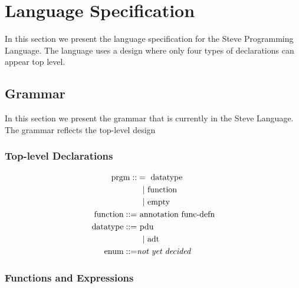 \newcommand{\pn}[1]{ \textnormal{#1} }
\newcommand{\oo}{\; \mid \;}
\newcommand{\nb}{~~~|~}
\newcommand{\sk}{\dots }
\newcommand{\ww}{\;}
\newcommand{\nn}{\perp}
\newcommand{\sm}[1]{\textnormal{#1}}
\newcommand{\sd}[1]{\textnormal{\it #1}}


\section{Language Specification}
In this section we present the language specification for the Steve Programming
Language. The language uses a design where only four types of declarations can
appear top level.

\subsection{Grammar}
In this section we present the grammar that is currently in the Steve Language.
The grammar reflects the top-level design

\subsubsection{Top-level Declarations}

\begin{align*}
  \pn{prgm} ::&=~ \pn{datatype} \\
         &~~|~ \pn{function} \\
         &~~|~ \pn{empty} \\
  \pn{function} ::=&~ \pn{annotation} ~ \pn{func-defn} \\
  \pn{datatype} ::=&~ \pn{pdu} \\
             &~~|~ \pn{adt} \\
  \pn{enum} ::=& \pn{\emph{not yet decided}}
\end{align*}

\subsubsection{Functions and Expressions}

